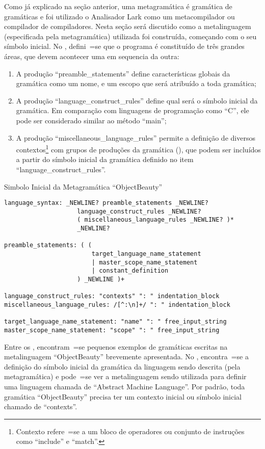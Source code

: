 Como já explicado na seção anterior,
uma metagramática é gramática de gramáticas e
foi utilizado o Analisador Lark como um metacompilador ou
compilador de compiladores.
Nesta seção será discutido como a metalinguagem (especificada pela metagramática) utilizada foi construída,
começando com o seu símbolo inicial.
No ,
defini~=se que o programa é constituído de três grandes áreas,
que devem acontecer uma em sequencia da outra:
\begin{enumerate}
\item A produção ``preamble\_statements'' define características globais da gramática como um nome,
e um escopo que será atribuído a toda gramática;
\item A produção ``language\_construct\_rules'' define qual será o símbolo inicial da gramática.
Em comparação com linguagens de programação como ``C'',
ele pode ser considerado similar ao método ``main'';
\item A produção ``miscellaneous\_language\_rules'' permite a definição de diversos contextos\footnote{
Contexto refere~=se a um bloco de operadores ou
conjunto de instruções como ``include'' e
``match''.
} com grupos de produções da gramática (),
que podem ser incluídos a partir do símbolo inicial da gramática definido no item ``language\_construct\_rules''.
\end{enumerate}%
\begin{code}
\caption{Simbolo Inicial da Metagramática ``ObjectBeauty''}
\label{simboloInicialDaMetagramatica}
\begin{verbatim}
language_syntax: _NEWLINE? preamble_statements _NEWLINE?
                    language_construct_rules _NEWLINE?
                    ( miscellaneous_language_rules _NEWLINE? )*
                    _NEWLINE?

preamble_statements: ( (
                        target_language_name_statement
                        | master_scope_name_statement
                        | constant_definition
                    ) _NEWLINE )+

language_construct_rules: "contexts" ": " indentation_block
miscellaneous_language_rules: /[^:\n]+/ ": " indentation_block

target_language_name_statement: "name" ": " free_input_string
master_scope_name_statement: "scope" ": " free_input_string
\end{verbatim}
\end{code}

Entre os ,
encontram~=se pequenos exemplos de gramáticas escritas na metalinguagem ``ObjectBeauty'' brevemente apresentada.
No ,
encontra~=se a definição do símbolo inicial da gramática da linguagem sendo descrita (pela metagramática) e
pode~=se ver a metalinguagem sendo utilizada para definir uma linguagem chamada de ``Abstract Machine Language''.
Por padrão,
toda gramática ``ObjectBeauty'' precisa ter um contexto inicial ou
símbolo inicial chamado de ``contexts''.

